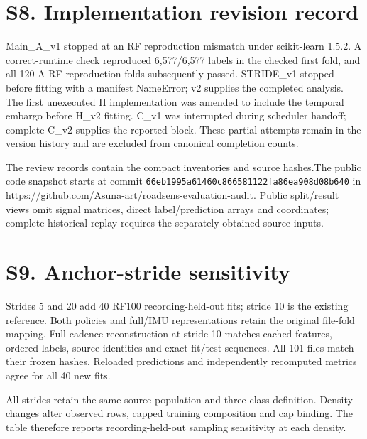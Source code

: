 \section*{S8. Implementation revision record}
Main\_A\_v1 stopped at an RF reproduction mismatch under scikit-learn 1.5.2. A correct-runtime check reproduced 6,577/6,577 labels in the checked first fold, and all 120 A RF reproduction folds subsequently passed. STRIDE\_v1 stopped before fitting with a manifest NameError; v2 supplies the completed analysis. The first unexecuted H implementation was amended to include the temporal embargo before H\_v2 fitting. C\_v1 was interrupted during scheduler handoff; complete C\_v2 supplies the reported block. These partial attempts remain in the version history and are excluded from canonical completion counts.

\ifanonymous The review records contain the compact inventories and source hashes.\else The public code snapshot starts at commit \texttt{66eb1995a61460c866581122fa86ea908d08b640} in \url{https://github.com/Asuna-art/roadsens-evaluation-audit}.\fi{} Public split/result views omit signal matrices, direct label/prediction arrays and coordinates; complete historical replay requires the separately obtained source inputs.

\section*{S9. Anchor-stride sensitivity}
Strides 5 and 20 add 40 RF100 recording-held-out fits; stride 10 is the existing reference. Both policies and full/IMU representations retain the original file-fold mapping. Full-cadence reconstruction at stride 10 matches cached features, ordered labels, source identities and exact fit/test sequences. All 101 files match their frozen hashes. Reloaded predictions and independently recomputed metrics agree for all 40 new fits.

All strides retain the same source population and three-class definition. Density changes alter observed rows, capped training composition and cap binding. The table therefore reports recording-held-out sampling sensitivity at each density.

